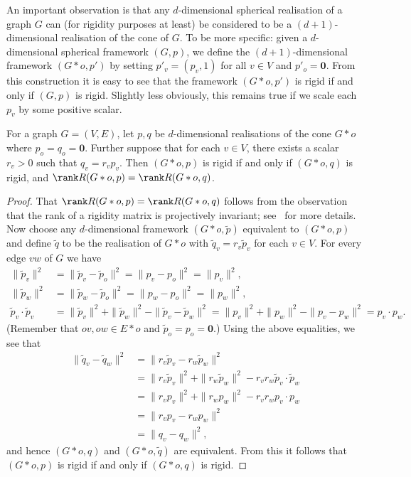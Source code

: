 An important observation is that any $d$-dimensional spherical realisation of a graph $G$ can (for rigidity purposes at least) be considered to be a $(d+1)$-dimensional realisation of the cone of $G$.
To be more specific:
given a $d$-dimensional spherical framework $(G,p)$,
we define the $(d+1)$-dimensional framework $(G*o,p')$ by setting $p'_v=(p_v,1)$ for all $v \in V$ and $p'_o = \mathbf{0}$.
From this construction it is easy to see that the framework $(G*o,p')$ is rigid if and only if $(G,p)$ is rigid.
Slightly less obviously,
this remains true if we scale each $p_v$ by some positive scalar.

\begin{proposition}\label{p:slide}
	For a graph $G=(V,E)$,
	let $p,q$ be $d$-dimensional realisations of the cone $G*o$ where $p_o=q_o = \mathbf{0}$.
	Further suppose that for each $v \in V$,
	there exists a scalar $r_v >0$ such that $q_v = r_v p_v$.
	Then $(G*o,p)$ is rigid if and only if $(G*o,q)$ is rigid,
	and $\rank R(G*o,p) = \rank R(G*o,q)$.
\end{proposition}

\begin{proof}
	That $\rank R(G*o,p) = \rank R(G*o,q)$ follows from the observation that the rank of a rigidity matrix is projectively invariant;
	see~\cite[Theorem 1]{Izm09} for more details.
	Now choose any $d$-dimensional framework $(G*o,\tilde{p})$ equivalent to $(G*o,p)$ and define $\tilde{q}$ to be the realisation of $G*o$ with $\tilde{q}_v = r_v \tilde{p}_v$ for each $v \in V$.
	For every edge $vw$ of $G$ we have
	\begin{align*}
		\|\tilde{p}_v\|^2 &= \|\tilde{p}_v - \tilde{p}_o\|^2 = \|p_v - p_o\|^2 = \|p_v\|^2,\\
		\|\tilde{p}_w\|^2 &= \|\tilde{p}_w - \tilde{p}_o\|^2 = \|p_w - p_o\|^2 = \|p_w\|^2,\\
		\tilde{p}_v \cdot \tilde{p}_v &=  \|\tilde{p}_v\|^2 + \|\tilde{p}_w\|^2 - \| \tilde{p}_v - \tilde{p}_w\|^2= \|p_v\|^2 + \|p_w\|^2 - \| p_v - p_w\|^2 = p_v \cdot p_w.
	\end{align*}
	(Remember that $ov , ow \in E*o$ and $\tilde{p}_o = p_o = \mathbf{0}$.)
	Using the above equalities,
	we see that
	\begin{align*}
		\|\tilde{q}_v-\tilde{q}_w\|^2 &= \|r_v\tilde{p}_v-r_w\tilde{p}_w\|^2 \\
		&= \|r_v\tilde{p}_v\|^2 + \|r_w\tilde{p}_w\|^2 - r_v r_w\tilde{p}_v \cdot \tilde{p}_w \\
		&= \|r_vp_v\|^2 + \|r_wp_w\|^2 - r_v r_wp_v \cdot p_w  \\
		&= \|r_vp_v-r_wp_w\|^2 \\
		&= \|q_v-q_w\|^2,
	\end{align*}
	and hence $(G*o,q)$ and $(G*o,\tilde{q})$ are equivalent.
	From this it follows that $(G*o,p)$ is rigid if and only if $(G*o,q)$ is rigid.
\end{proof}

